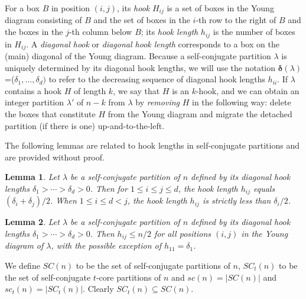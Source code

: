 \documentclass[12pt,leqno]{amsart}
\newtheorem{lem}{Lemma}[section]
\numberwithin{equation}{section}
\theoremstyle{definition}
\begin{document}
For a box $B$ in position $(i,j)$, its {\em hook} $H_{ij}$ is a set of boxes in the Young diagram consisting of $B$ and the set of boxes in the $i$-th row to the right of $B$ and the boxes in the $j$-th column below $B$; its {\it hook length} $h_{ij}$ is the number of boxes in $H_{ij}$.  A {\em diagonal hook} or {\em diagonal hook length} corresponds to a box on the (main) diagonal of the Young diagram.  Because a self-conjugate partition $\lambda$ is uniquely determined by its diagonal hook lengths, we will use the notation $\boldsymbol\delta(\lambda)$=($\delta_{1},\hdots,\delta_d)$ to refer to the decreasing sequence of diagonal hook lengths $h_{ii}$. If $\lambda$ contains a hook $H$ of length $k$, we say that $H$ is an $k$-hook, and we can obtain an integer partition $\lambda'$ of $n-k$ from $\lambda$ by {\em removing} $H$ in the following way: delete the boxes that constitute $H$ from the Young diagram and migrate the detached partition (if there is one) up-and-to-the-left. 

The following lemmas are related to hook lengths in self-conjugate partitions and are provided without proof.

\begin{lem} Let ${\lambda}$ be a self-conjugate partition of $n$ defined by its diagonal hook lengths $\delta_1> \cdots> \delta_d>0$.
Then for $1\leq i\leq j\leq d$, the hook length $h_{ij}$ equals $(\delta_i+\delta_j)/2$.  When $1\leq i\leq d< j$, the hook length $h_{ij}$ is strictly less than $\delta_i/2$.
\label{p:hij}
\end{lem}

\begin{lem} Let ${\lambda}$ be a self-conjugate partition of $n$ defined by its diagonal hook lengths $\delta_1> \cdots> \delta_d>0$.  Then $h_{ij}\leq n/2$ for all positions $(i,j)$ in the Young diagram of ${\lambda}$, with the possible exception of $h_{11}=\delta_1$.
\label{p:bighooks}
\end{lem}

We define $SC(n)$ to be the set of self-conjugate partitions of $n$, $SC_t(n)$ to be the set of self-conjugate $t$-core partitions of $n$ and $sc(n)=|SC(n)|$ and $sc_t(n)=|SC_t(n)|$. Clearly $SC_t(n)\subseteq SC(n)$.  
\end{document}
